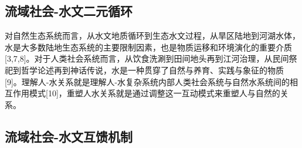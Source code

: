 \subsection{流域社会-水文二元循环}

对自然生态系统而言，从水文地质循环到生态水文过程，从旱区陆地到河湖水体，水是大多数陆地生态系统的主要限制因素，也是物质运移和环境演化的重要介质[3,7,8]。对于人类社会系统而言，从饮食洗涮到田间地头再到江河治理，从民间祭祀到哲学论述再到神话传说，水是一种贯穿了自然与养育、实践与象征的物质[9]。理解人-水关系就是理解人-水复杂系统内部人类社会系统与自然水系统间的相互作用模式[10]，重塑人水关系就是通过调整这一互动模式来重塑人与自然的关系。

\subsection{流域社会-水文互馈机制}

